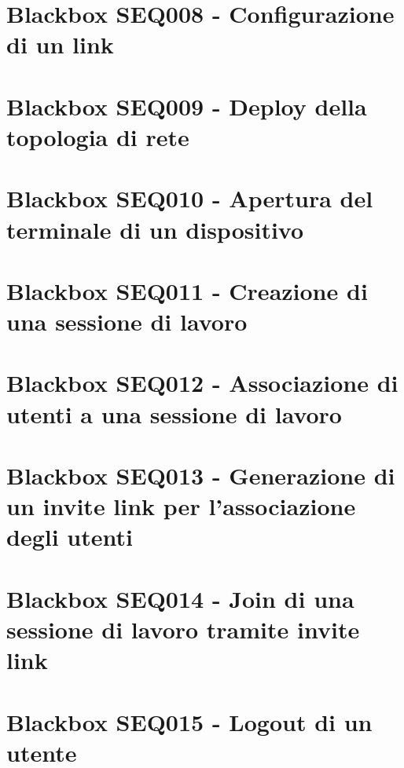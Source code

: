\documentclass[../main.tex]{subfiles}
\begin{document}
\section{Blackbox SEQ008 - Configurazione di un link }
\figure[H]
\centering

\endfigure
\vfill\newpage
\section{Blackbox SEQ009 - Deploy della topologia di rete }
\figure[H]
\centering

\endfigure
\vfill\newpage
\section{Blackbox SEQ010 - Apertura del terminale di un dispositivo }
\figure[H]
\centering

\endfigure
\vfill\newpage
\section{Blackbox SEQ011 - Creazione di una sessione di lavoro }
\figure[H]
\centering

\endfigure
\vfill\newpage
\section{Blackbox SEQ012 - Associazione di utenti a una sessione di lavoro }
\figure[H]
\centering

\endfigure
\vfill\newpage
\section{Blackbox SEQ013 - Generazione di un invite link per l'associazione degli utenti }
\figure[H]
\centering

\endfigure
\vfill\newpage
\section{Blackbox SEQ014 - Join di una sessione di lavoro tramite invite link }
\figure[H]
\centering

\endfigure
\vfill\newpage
\section{Blackbox SEQ015 - Logout di un utente }
\figure[H]
\centering

\endfigure
\end{document}
